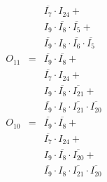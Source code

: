 \documentclass[a4paper,russian]{report}
\begin{document}
\begin{eqnarray*}
	& &  \overline{I_{7}} \cdotp I_{24} + \\
	& &  I_{9} \cdotp \overline{I_{8}} \cdotp \overline{I_{5}} + \\
	& &  \overline{I_{9}} \cdotp I_{8} \cdotp \overline{I_{6}} \cdotp \overline{I_{5}} \\
    O_{11} & = & \overline{I_{9}} \cdotp \overline{I_{8}} + \\
	& &  \overline{I_{7}} \cdotp I_{24} + \\
	& &  I_{9} \cdotp \overline{I_{8}} \cdotp \overline{I_{21}} + \\
	& &  \overline{I_{9}} \cdotp I_{8} \cdotp \overline{I_{21}} \cdotp \overline{I_{20}} \\
    O_{10} & = & \overline{I_{9}} \cdotp \overline{I_{8}} + \\
	& &  \overline{I_{7}} \cdotp I_{24} + \\
	& &  I_{9} \cdotp \overline{I_{8}} \cdotp \overline{I_{20}} + \\
	& &  \overline{I_{9}} \cdotp I_{8} \cdotp \overline{I_{21}} \cdotp \overline{I_{20}} \\
 \end{eqnarray*}
\pagebreak[1]
\end{document}
